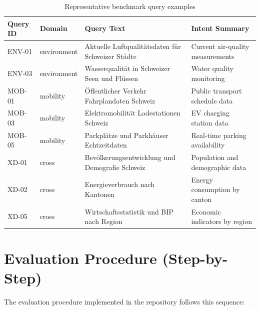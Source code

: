 \documentclass[11pt,a4paper]{article}
\begin{document}
\begin{table}[H]
\centering
\begin{tabular}{p{} p{} p{} p{}}
\toprule
\textbf{Query ID} & \textbf{Domain} & \textbf{Query Text} & \textbf{Intent Summary} \\
\midrule
ENV-01 & environment & Aktuelle Luftqualit\"atsdaten f\"ur Schweizer St\"adte & Current air-quality measurements \\
ENV-03 & environment & Wasserqualit\"at in Schweizer Seen und Fl\"ussen & Water quality monitoring \\
MOB-01 & mobility & \"Offentlicher Verkehr Fahrplandaten Schweiz & Public transport schedule data \\
MOB-03 & mobility & Elektromobilit\"at Ladestationen Schweiz & EV charging station data \\
MOB-05 & mobility & Parkpl\"atze und Parkh\"auser Echtzeitdaten & Real-time parking availability \\
XD-01 & cross & Bev\"olkerungsentwicklung und Demografie Schweiz & Population and demographic data \\
XD-02 & cross & Energieverbrauch nach Kantonen & Energy consumption by canton \\
XD-05 & cross & Wirtschaftsstatistik und BIP nach Region & Economic indicators by region \\
\bottomrule
\end{tabular}
\caption{Representative benchmark query examples}
\end{table}

\section{Evaluation Procedure (Step-by-Step)}

The evaluation procedure implemented in the repository follows this sequence:
\end{document}
